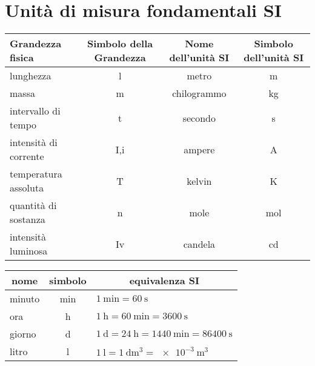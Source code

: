 \section{Unità di misura fondamentali SI}
\label{sec:UnitàDiMisuraFondamentaliSI}
\begin{center}
	\begin{tabular}{lccc}
\toprule
Grandezza fisica&Simbolo della Grandezza& Nome dell'unità SI&Simbolo dell'unità SI\\
\midrule
lunghezza&l&metro&\si{\metre}\\
massa&m&chilogrammo&\si{\kilogram}\\
intervallo di tempo&t&secondo&\si{\second}\\
intensità di corrente&I,i&ampere&\si{\ampere}\\
temperatura assoluta&T&kelvin&\si{\kelvin}\\
quantità di sostanza&n&mole&\si{\mole}\\
intensità luminosa&Iv&candela&\si{\candela}\\
\bottomrule
\end{tabular}
\end{center}
\begin{center}
	\begin{tabular}{lcl}
		\toprule 
		\multicolumn{1}{c}{nome}&simbolo&\multicolumn{1}{c}{equivalenza SI}\\
		\midrule
		minuto&\si{\minute}&$\SI{1}{\minute}=\SI{60}{\second}$\\
		ora&\si{\hour}&$\SI{1}{\hour}=\SI{60}{\minute}=\SI{3600}{\second}$\\
		giorno&\si{\day}&$\SI{1}{\day}=\SI{24}{\hour}=\SI{1440}{\minute} = \SI{86400}{\second}$\\
		litro&\si{\litre}&$\SI{1}{\litre}=\SI{1}{\deci\metre\tothe{3}}=\SI{e-3}{\metre\tothe{3}}$\\
		\bottomrule
	\end{tabular}
\end{center}
